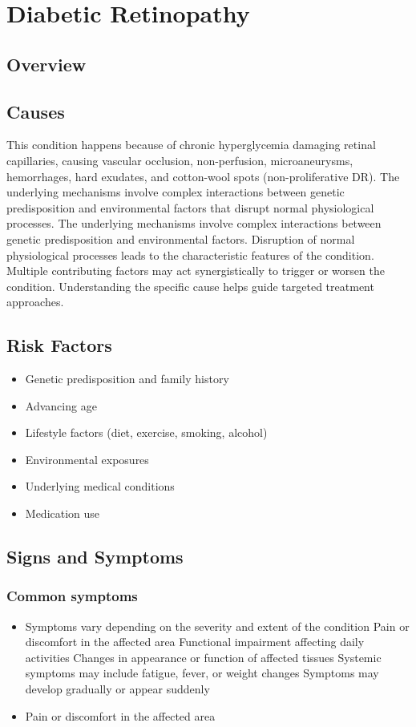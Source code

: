 \chapter{Diabetic Retinopathy}
\label{sec:Diabetic Retinopathy}

\section{Overview}

\section{Causes}
This condition happens because of chronic hyperglycemia damaging retinal capillaries, causing vascular occlusion, non-perfusion, microaneurysms, hemorrhages, hard exudates, and cotton-wool spots (non-proliferative DR). The underlying mechanisms involve complex interactions between genetic predisposition and environmental factors that disrupt normal physiological processes. The underlying mechanisms involve complex interactions between genetic predisposition and environmental factors. Disruption of normal physiological processes leads to the characteristic features of the condition. Multiple contributing factors may act synergistically to trigger or worsen the condition. Understanding the specific cause helps guide targeted treatment approaches.
\section{Risk Factors}


\begin{itemize}[noitemsep]
  \item Genetic predisposition and family history
  \item Advancing age
  \item Lifestyle factors (diet, exercise, smoking, alcohol)
  \item Environmental exposures
  \item Underlying medical conditions
  \item Medication use
\end{itemize}
\section{Signs and Symptoms}

\subsection{Common symptoms}
\begin{itemize}[noitemsep]
  \item Symptoms vary depending on the severity and extent of the condition Pain or discomfort in the affected area Functional impairment affecting daily activities Changes in appearance or function of affected tissues Systemic symptoms may include fatigue, fever, or weight changes Symptoms may develop gradually or appear suddenly
  \item Pain or discomfort in the affected area
  \end{itemize}

